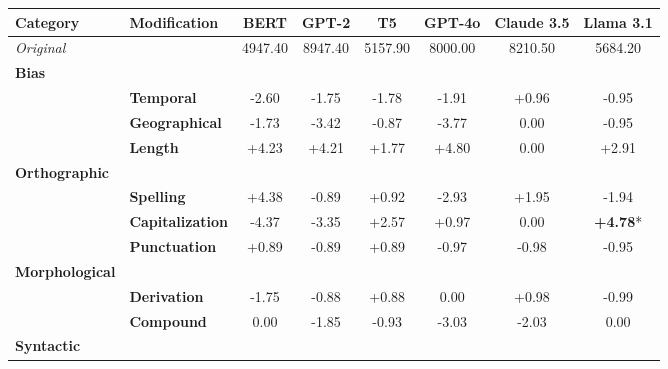 \begin{table}[h]
\centering
\footnotesize
\begin{adjustbox}{max width=\linewidth}
\begin{tabular}{llcccccc}
\hline
Category & Modification & \textbf{BERT} & \textbf{GPT-2} & \textbf{T5} & \textbf{GPT-4o} & \textbf{Claude 3.5} & \textbf{Llama 3.1} \\
\hline
\rowcolor{gray!20}\textit{Original} & & 4947.40 & 8947.40 & 5157.90 & 8000.00 & 8210.50 & 5684.20 \\
\textbf{Bias} & & & & & & & \\
& \textbf{Temporal} & \cellcolor{red!7} -2.60 & \cellcolor{red!5} -1.75 & \cellcolor{red!5} -1.78 & \cellcolor{red!5} -1.91 & \cellcolor{green!2} +0.96 & \cellcolor{red!2} -0.95 \\
& \textbf{Geographical} & \cellcolor{red!5} -1.73 & \cellcolor{red!10} -3.42 & \cellcolor{red!2} -0.87 & \cellcolor{red!11} -3.77 & \cellcolor{red!0} 0.00 & \cellcolor{red!2} -0.95 \\
& \textbf{Length} & \cellcolor{green!12} +4.23 & \cellcolor{green!12} +4.21 & \cellcolor{green!5} +1.77 & \cellcolor{green!14} +4.80 & \cellcolor{red!0} 0.00 & \cellcolor{green!8} +2.91 \\
\textbf{Orthographic} & & & & & & & \\
& \textbf{Spelling} & \cellcolor{green!13} +4.38 & \cellcolor{red!2} -0.89 & \cellcolor{green!2} +0.92 & \cellcolor{red!8} -2.93 & \cellcolor{green!5} +1.95 & \cellcolor{red!5} -1.94 \\
& \textbf{Capitalization} & \cellcolor{red!13} -4.37 & \cellcolor{red!10} -3.35 & \cellcolor{green!7} +2.57 & \cellcolor{green!2} +0.97 & \cellcolor{red!0} 0.00 & \cellcolor{green!14} \textbf{+4.78}* \\
& \textbf{Punctuation} & \cellcolor{green!2} +0.89 & \cellcolor{red!2} -0.89 & \cellcolor{green!2} +0.89 & \cellcolor{red!2} -0.97 & \cellcolor{red!2} -0.98 & \cellcolor{red!2} -0.95 \\
\textbf{Morphological} & & & & & & & \\
& \textbf{Derivation} & \cellcolor{red!5} -1.75 & \cellcolor{red!2} -0.88 & \cellcolor{green!2} +0.88 & \cellcolor{red!0} 0.00 & \cellcolor{green!2} +0.98 & \cellcolor{red!2} -0.99 \\
& \textbf{Compound} & \cellcolor{red!0} 0.00 & \cellcolor{red!5} -1.85 & \cellcolor{red!2} -0.93 & \cellcolor{red!9} -3.03 & \cellcolor{red!6} -2.03 & \cellcolor{red!0} 0.00 \\
\textbf{Syntactic} & & & & & & & \\

\end{tabular}
\end{adjustbox}
\end{table}
